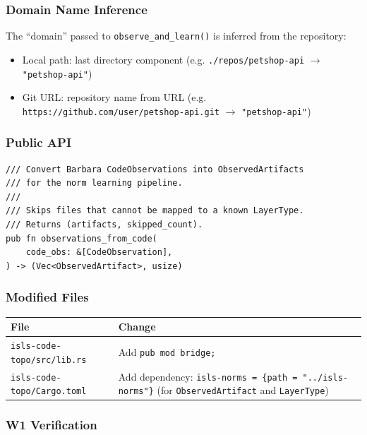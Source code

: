 \documentclass[11pt,a4paper]{article}
\begin{document}
\subsubsection{Domain Name Inference}

The ``domain'' passed to \texttt{observe\_and\_learn()} is inferred from
the repository:

\begin{itemize}[nosep]
\item Local path: last directory component
      (e.g. \texttt{./repos/petshop-api} $\to$ \texttt{"petshop-api"})
\item Git URL: repository name from URL
      (e.g. \texttt{https://github.com/user/petshop-api.git}
      $\to$ \texttt{"petshop-api"})
\end{itemize}

\subsubsection{Public API}

\begin{lstlisting}[style=rust]
/// Convert Barbara CodeObservations into ObservedArtifacts
/// for the norm learning pipeline.
///
/// Skips files that cannot be mapped to a known LayerType.
/// Returns (artifacts, skipped_count).
pub fn observations_from_code(
    code_obs: &[CodeObservation],
) -> (Vec<ObservedArtifact>, usize)
\end{lstlisting}

\subsubsection{Modified Files}

\begin{longtable}{lp{10cm}}
\toprule
\textbf{File} & \textbf{Change} \\
\midrule
\texttt{isls-code-topo/src/lib.rs}
  & Add \texttt{pub mod bridge;} \\
\texttt{isls-code-topo/Cargo.toml}
  & Add dependency: \texttt{isls-norms = \{path = "../isls-norms"\}}
    (for \texttt{ObservedArtifact} and \texttt{LayerType}) \\
\bottomrule
\end{longtable}

\subsubsection{W1 Verification}
\end{document}
